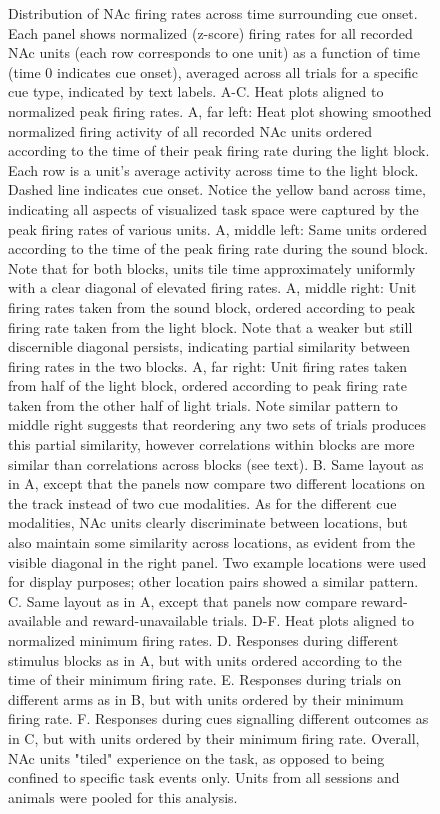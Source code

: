 \documentclass[11pt]{article}
\begin{document}
\begin{figure}[h]
\caption{Distribution of NAc firing rates across time surrounding cue onset. Each panel shows normalized (z-score) firing rates for all recorded NAc units (each row corresponds to one unit) as a function of time (time 0 indicates cue onset), averaged across all trials for a specific cue type, indicated by text labels. A-C. Heat plots aligned to normalized peak firing rates. A, far left: Heat plot showing smoothed normalized firing activity of all recorded NAc units ordered according to the time of their peak firing rate during the light block. Each row is a unit’s average activity across time to the light block. Dashed line indicates cue onset. Notice the yellow band across time, indicating all aspects of visualized task space were captured by the peak firing rates of various units. A, middle left: Same units ordered according to the time of the peak firing rate during the sound block. Note that for both blocks, units tile time approximately uniformly with a clear diagonal of elevated firing rates. A, middle right: Unit firing rates taken from the sound block, ordered according to peak firing rate taken from the light block. Note that a weaker but still discernible diagonal persists, indicating partial similarity between firing rates in the two blocks. A, far right: Unit firing rates taken from half of the light block, ordered according to peak firing rate taken from the other half of light trials. Note similar pattern to middle right suggests that reordering any two sets of trials produces this partial similarity, however correlations within blocks are more similar than correlations across blocks (see text). B. Same layout as in A, except that the panels now compare two different locations on the track instead of two cue modalities. As for the different cue modalities, NAc units clearly discriminate between locations, but also maintain some similarity across locations, as evident from the visible diagonal in the right panel. Two example locations were used for display purposes; other location pairs showed a similar pattern. C. Same layout as in A, except that panels now compare reward-available and reward-unavailable trials. D-F. Heat plots aligned to normalized minimum firing rates. D. Responses during different stimulus blocks as in A, but with units ordered according to the time of their minimum firing rate. E. Responses during trials on different arms as in B, but with units ordered by their minimum firing rate. F. Responses during cues signalling different outcomes as in C, but with units ordered by their minimum firing rate. Overall, NAc units "tiled" experience on the task, as opposed to being confined to specific task events only. Units from all sessions and animals were pooled for this analysis.}
\label{fig:tiling}
\end{figure}
\end{document}
